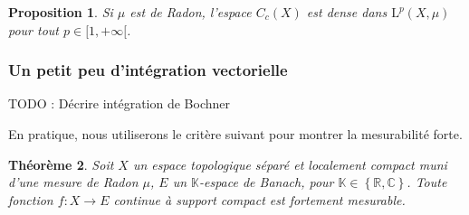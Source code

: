 \documentclass[a4paper,12pt]{article}
\newtheorem{theorem}{Théorème}[section]
\newtheorem{proposition}[theorem]{Proposition}
\newtheorem{lemma}[theorem]{Lemme}
\newcommand{\R}{\mathbb{R}}
\newcommand{\C}{\mathbb{C}}
\newcommand{\K}{\mathbb{K}}
\newcommand{\Bor}{\mathcal{B}}
\newcommand{\set}[1]{\left\{ #1 \right\}}
\newcommand{\TODO}[1]{{\color{red}TODO :} #1}
\begin{document}
\begin{proposition}\label{cont_supp_compact_dense_Lp}
    Si $\mu$ est de Radon, l'espace $C_c(X)$ est dense dans $\mathrm{L}^p(X, \mu)$ pour tout $p\in[1, +\infty[$.
\end{proposition}

%
%     
%
%    

\subsubsection*{Un petit peu d'intégration vectorielle}

\TODO{Décrire intégration de Bochner}

%

En pratique, nous utiliserons le critère suivant pour montrer la mesurabilité forte.

\begin{theorem}\label{strong_measurable_crit}
    Soit $X$ un espace topologique séparé et localement compact muni d'une mesure de Radon $\mu$,
    $E$ un $\K$-espace de Banach, pour $\K\in\set{\R, \C}$. Toute fonction $f:X\to E$ continue à support compact est
    fortement mesurable.
\end{theorem}
\end{document}
